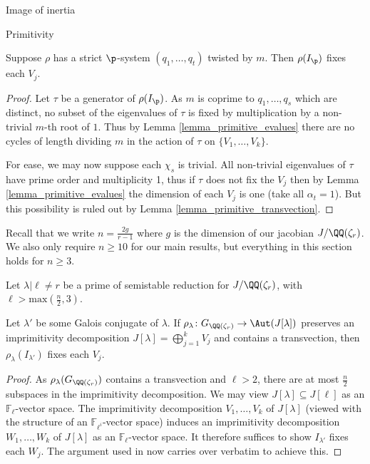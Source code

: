 \documentclass[11pt,a4paper]{article}
\newcommand{\Fl}{\mathbb{F}_\ell}
\newcommand{\Fli}{\mathbb{F}_{\ell^i}}
\newcommand{\Qr}{{\QQ(\zeta_r)}}
\newcommand{\GQr}{G_{\QQ(\zeta_{r})}}
\begin{document}
\begin{section}{Image of inertia}
\begin{subsection}{Primitivity}
\begin{proposition}
Suppose $\rho$ has a strict $\p$-system $(q_1, \ldots, q_t)$ twisted by $m$.
Then $\rho(I_\p)$ fixes each $V_j$. 
\end{proposition}

\begin{proof}
 Let $\tau$ be a generator of $\rho(I_\p)$. As $m$ is coprime to $q_1, \ldots,q_s $ which are distinct, no subset of the eigenvalues of $\tau$ is fixed by multiplication by a non-trivial $m$-th root of $1$. Thus by Lemma \ref{lemma_primitive_evalues} there are no cycles of length dividing $m$ in the action of $\tau$ on $\{V_1, \ldots, V_k\}$.

For ease, we may now suppose each $\chi_s$ is trivial. All non-trivial eigenvalues of $\tau$ have prime order and multiplicity 1, thus if $\tau$ does not fix the $V_j$ then by Lemma \ref{lemma_primitive_evalues} the dimension of each $V_j$ is one (take all $\alpha_t=1$). But this possibility is ruled out by Lemma \ref{lemma_primitive_transvection}.
\end{proof}


Recall that we write $n=\frac{2g}{r-1}$ where $g$ is the dimension of our jacobian $J/\Qr$.
We also only require $n \geq 10$ for our main results, but everything in this section holds for $n \geq 3$.

\begin{proposition}
\label{prop_primitivity_l_big_enough_no_worries}
Let $\lambda|\ell \neq r$ be a prime of semistable reduction for $J/\Qr$, with $\ell> \mathrm {max}(\frac{n}{2},3)$.

Let $\lambda'$ be some Galois conjugate of $\lambda$.
If $\rho_{\lambda} \colon \GQr \rightarrow \Aut(J[\lambda])$ preserves an imprimitivity decomposition $J[\lambda] = \bigoplus^{k}_{j=1} V_j$ and contains a transvection, then $\rho_{\lambda}(I_{\lambda'})$ fixes each $V_j$.
\end{proposition}

\begin{proof}
 As $\rho_{\lambda}(\GQr)$ contains a transvection and $\ell>2$, there are at most $\frac{n}{2}$ subspaces in the imprimitivity decomposition. We may view $J[\lambda] \subseteq J[\ell]$ as an $\Fl$-vector space. The imprimitivity decomposition $V_1, \ldots, V_k$ of $J[\lambda]$ (viewed with the structure of an $\Fli$-vector space) induces an imprimitivity decomposition $W_1, \ldots, W_k$ of  $J[\lambda] $ as an $\Fl$-vector space.
 It therefore suffices to show $I_{\lambda'}$ fixes each $W_j$.
  The argument used in \cite[Prop.4.12]{Anni_VDok} now carries over verbatim to achieve this.
\end{proof}



\end{subsection}
\end{section}
\end{document}
